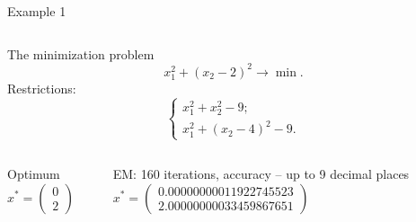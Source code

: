 \begin{frame}{Example 1}

\begin{columns}[T]

\begin{column}[T]{0.35\textwidth}
\begin{block}{The minimization problem}
$$
x_1^2+(x_2-2)^2\rightarrow \min.
$$
Restrictions:
$$
\left\{
\begin{array}{l}
x_1^2+x_2^2-9; \\
x_1^2+(x_2-4)^2-9.
\end{array}
\right.
$$
\end{block}
\end{column}

\begin{column}[T]{0.6\textwidth}
\begin{center}
\texttt{[image: \\figpath\{ObjectivePlot]}}
\end{center}
\end{column}

\end{columns}

\begin{columns}[T]

\begin{column}[T]{0.35\textwidth}
\begin{block}{Optimum}
\centering
$
x^*=\left(
\begin{array}{c}
0 \\
2
\end{array}
\right)
$
\end{block}
\end{column}

\begin{column}[T]{0.6\textwidth}
\begin{block}{EM: 160 iterations, accuracy -- up to 9 decimal places}
\centering
$
x^*=\left(
\begin{array}{c}
0.00000000011922745523 \\
2.00000000033459867651
\end{array}
\right)
$
\end{block}
\end{column}

\end{columns}

\end{frame}